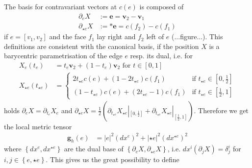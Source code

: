 \documentclass[a4paper,11pt]{scrartcl}
\newcommand{\e}{\mathbf{e}}
\renewcommand{\v}{\mathbf{v}}
\begin{document}
    The basis for contravariant vectors at \( c(e) \) is composed of
    \begin{align}
      \partial_{e}X &:= \e = \v_{2} - \v_{1} \\
      \partial_{\star e}X &:= *\e =  c(f_{2}) - c(f_{1})
    \end{align}
    if \( e=\left[ v_{1}, v_{2} \right] \) and the face \( f_{1} \) lay right and \( f_{2} \) left of \( e \) (...figure...). 
    This definitions are consistent with the canonical basis, if the position \( X \) is a barycentric parametrisation of the edge \( e \)
    resp. its dual, i.e. for
    \begin{align}
      X_{e}(t_{e}) &= t_{e}\v_{2} + \left( 1 - t_{e} \right)\v_{2} \text{ for } t\in[0,1]\\
      X_{\star e}(t_{\star e}) &=\begin{cases}
                        2t_{\star e}c(e) + \left( 1 - 2t_{\star e} \right) c(f_{1}) & \text{if } t_{\star e}\in\left[ 0 , \frac{1}{2} \right] \\
                        \left(1 - t_{\star e}\right) c(e) + \left( 2t_{\star e} - 1 \right) c(f_{1}) 
                                & \text{if } t_{\star e}\in \left[\frac{1}{2} , 1\right]
                      \end{cases}
    \end{align}
    holds \( \partial_{e}X = \partial_{t_{e}}X_{e} \) 
    and \( \partial_{\star e}X = \frac{1}{2} \left( \partial_{t_{\star e}}X_{\star e}|_{\left[ 0 , \frac{1}{2} \right]} 
                                                   + \partial_{t_{\star e}}X_{\star e}|_{\left[\frac{1}{2}, 1 \right]}\right) \).
    Therefore we get the local metric tensor
    \begin{align}
      \mathbf{g}_h(e) &= \left| e \right|^{2} \left( dx^{e} \right)^{2} + \left| \star e \right|^{2} \left( dx^{\star e} \right)^{2}
    \end{align}
    where \( \left\{  dx^{e}, dx^{\star e} \right\} \) are the dual base of \( \left\{ \partial_{e}X, \partial_{\star e}X \right\} \),
    i.e. \( dx^{i}\left(\partial_{j}X\right) = \delta^{i}_{j} \) for \( i,j\in\left\{ e, \star e \right\} \).
    This gives us the great possibility to define
\end{document}
